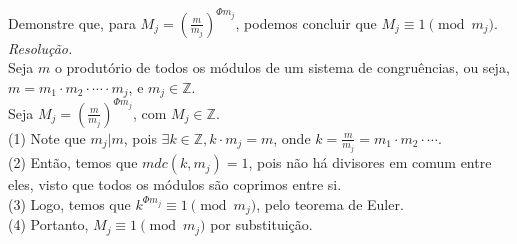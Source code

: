 Demonstre que, para $M_j = (\frac{m}{m_j})^{\Phi{m_j}}$, podemos concluir que $M_j \equiv 1 \pmod{m_j}$. \\
\emph{Resolução.} \\
Seja $m$ o produtório de todos os módulos de um sistema de congruências, ou seja, $m = m_1 \cdot m_2 \cdot \cdots \cdot m_j$, e $m_j \in \mathbb{Z}$. \\
Seja $M_j = (\frac{m}{m_j})^{\Phi{m_j}}$, com $M_j \in \mathbb{Z}$. \\
(1) Note que $m_j | m$, pois $\exists k \in \mathbb{Z}, k \cdot m_j = m$, onde $k = \frac{m}{m_j} = m_1 \cdot m_2 \cdot \cdots$. \\
(2) Então, temos que $mdc(k, m_j) = 1$, pois não há divisores em comum entre eles, visto que todos os módulos são coprimos entre si. \\
(3) Logo, temos que $k^{\Phi{m_j}} \equiv 1 \pmod{m_j}$, pelo teorema de Euler. \\
(4) Portanto, $M_j \equiv 1 \pmod{m_j}$ por substituição.
